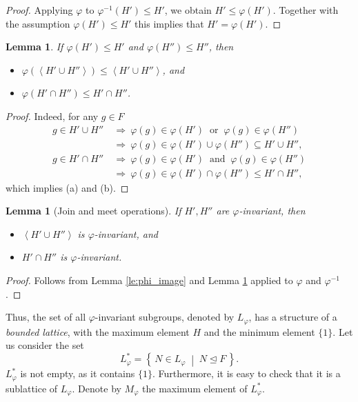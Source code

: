 \documentclass[12pt,oneside]{amsart}
\newtheorem{lemma}[theorem]{Lemma}
\theoremstyle{definition}
\theoremstyle{case}
\newcommand{\gp}[1]{{\left\langle #1 \right\rangle}}
\newcommand{\Set}[2]{\left\{\, #1 \;\middle|\; #2 \,\right\}}%
\begin{document}
\begin{proof}
Applying $\varphi$ to $\varphi^{-1}(H') \le H'$, 
we obtain $H' \le \varphi(H')$. Together with the assumption 
$\varphi(H') \le H'$ this implies that $H' = \varphi(H')$.
\end{proof}

\begin{lemma}\label{le:join-meet}
If 
$\varphi(H')\le H'$ and
$\varphi(H'')\le H''$, then 
\begin{itemize}
\item[(a)]
$\varphi(\gp{H' \cup H''})\le \gp{H'\cup H''}$, and
\item[(b)]
$\varphi(H' \cap H'')\le H'\cap H''$.
\end{itemize}
\end{lemma}

\begin{proof}
Indeed, for any $g\in F$
\begin{align*}
g\in H'\cup H''
&\ \Rightarrow\ 
\varphi(g) \in \varphi(H') 
\ \mbox{ or }\ 
\varphi(g) \in \varphi(H'') \\
&\ \Rightarrow\ 
\varphi(g) \in \varphi(H') \cup \varphi(H'') \subseteq H'\cup H'',\\
g\in H'\cap H''
&\ \Rightarrow\ 
\varphi(g) \in \varphi(H') 
\ \mbox{ and }\ 
\varphi(g) \in \varphi(H'') \\
&\ \Rightarrow\ 
\varphi(g) \in \varphi(H') \cap \varphi(H'') \le H'\cap H'',
\end{align*}
which implies (a) and (b).
\end{proof}


\begin{lemma}[Join and meet operations]
If $H',H''$  are $\varphi$-invariant, then 
\begin{itemize}
\item[(a)]
$\gp{H'\cup H''}$ is $\varphi$-invariant, and
\item[(b)]
$H'\cap H''$ is $\varphi$-invariant.
\end{itemize}
\end{lemma}

\begin{proof}
Follows from Lemma \ref{le:phi_image} and 
Lemma \ref{le:join-meet} applied 
to $\varphi$ and $\varphi^{-1}$.
\end{proof}

Thus, the set of all $\varphi$-invariant subgroups, denoted by $L_\varphi$,
has a structure of a \emph{bounded lattice},
with the maximum element $H$ and the minimum element $\{1\}$.
Let us consider the set
$$
L_\varphi^\ast = \Set{N\in L_\varphi}{N\unlhd F}.
$$
$L_\varphi^\ast$ is not empty, as it contains $\{1\}$.
Furthermore, it is easy to check that it is a sublattice of $L_\varphi$.
Denote by $M_\varphi$ the maximum element of $L_\varphi^\ast$.
\end{document}
